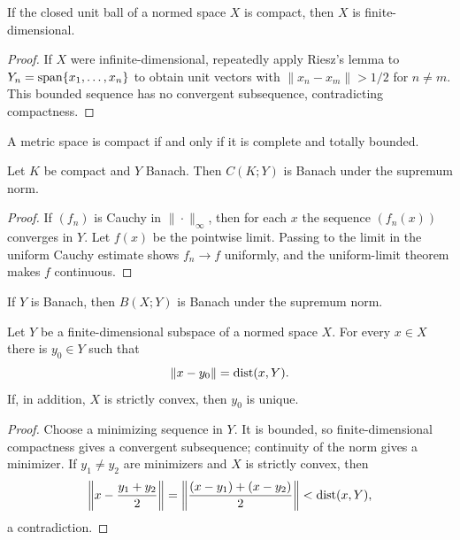\begin{notetheorem}
If the closed unit ball of a normed space $X$ is compact, then $X$ is
finite-dimensional.
\end{notetheorem}

\begin{proof}
If $X$ were infinite-dimensional, repeatedly apply Riesz's lemma to
$Y_n=\operatorname{span}\{x_1,\ldots,x_n\}$ to obtain unit vectors with
$\|x_n-x_m\|>1/2$ for $n\ne m$.  This bounded sequence has no convergent
subsequence, contradicting compactness.
\end{proof}

\begin{noteremark}
A metric space is compact if and only if it is complete and totally bounded.
\end{noteremark}

\begin{notetheorem}
Let $K$ be compact and $Y$ Banach.  Then $C(K;Y)$ is Banach under the
supremum norm.
\end{notetheorem}

\begin{proof}
If $(f_n)$ is Cauchy in $\|\cdot\|_\infty$, then for each $x$ the sequence
$(f_n(x))$ converges in $Y$.  Let $f(x)$ be the pointwise limit.  Passing to
the limit in the uniform Cauchy estimate shows $f_n\to f$ uniformly, and the
uniform-limit theorem makes $f$ continuous.
\end{proof}

\begin{notecorollary}
If $Y$ is Banach, then $B(X;Y)$ is Banach under the supremum norm.
\end{notecorollary}

\begin{notetheorem}
Let $Y$ be a finite-dimensional subspace of a normed space $X$.  For every
$x\in X$ there is $y_0\in Y$ such that
\[
  \|x-y_0\|=\operatorname{dist}(x,Y).
\]
If, in addition, $X$ is strictly convex, then $y_0$ is unique.
\end{notetheorem}

\begin{proof}
Choose a minimizing sequence in $Y$.  It is bounded, so finite-dimensional
compactness gives a convergent subsequence; continuity of the norm gives a
minimizer.  If $y_1\ne y_2$ are minimizers and $X$ is strictly convex, then
\[
 \left\|x-\frac{y_1+y_2}{2}\right\|
 =\left\|\frac{(x-y_1)+(x-y_2)}2\right\|
 <\operatorname{dist}(x,Y),
\]
a contradiction.
\end{proof}

